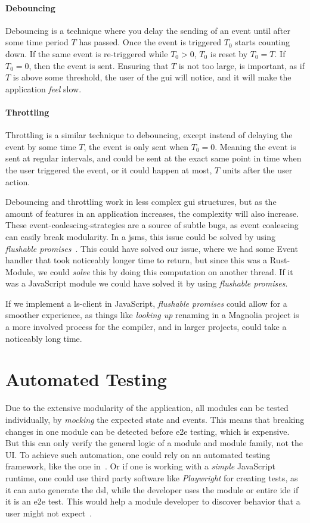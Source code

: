 \paragraph{Debouncing} Debouncing is a technique where you delay the sending of
an event until after some time period $T$ has passed. Once the event is triggered
$T_0$ starts counting down. If the same event is re-triggered while $T_0 > 0$,
$T_0$ is reset by $T_0 = T$. If $T_0 = 0$, then the event is sent. Ensuring that
$T$ is not too large, is important, as if $T$ is above some threshold, the user
of the \gls*{gui} will notice, and it will make the application \textit{feel}
slow.

\paragraph{Throttling} Throttling is a similar technique to debouncing, except
instead of delaying the event by some time $T$, the event is only sent when
$T_0 = 0$. Meaning the event is sent at regular intervals, and could be sent at
the exact same point in time when the user triggered the event, or it could
happen at most, $T$ units after the user action.

Debouncing and throttling work in less complex \gls*{gui} structures, but as the
amount of features in an application increases, the complexity will also
increase. These event-coalescing-strategies are a source of subtle bugs, as
event coalescing can easily break modularity. In a \gls*{jsms}, this issue could
be solved by using \textit{flushable promises}~\cite{flush}. This could have
solved our issue, where we had some Event handler that took noticeably longer
time to return, but since this was a Rust-Module, we could \textit{solve} this
by doing this computation on another thread. If it was a JavaScript module we
could have solved it by using \textit{flushable promises}.

If we implement a \gls*{ls}-client in JavaScript, \textit{flushable promises}
could allow for a smoother experience, as things like \textit{looking up}
renaming in a Magnolia project is a more involved process for the compiler,
and in larger projects, could take a noticeably long time.


\section{Automated Testing}

Due to the extensive modularity of the application, all modules can be tested
individually, by \textit{mocking} the expected state and events. This means that
breaking changes in one module can be detected before \gls*{e2e} testing, which
is expensive. But this can only verify the general logic of a module and module
family, not the UI. To achieve such automation, one could rely on an automated
testing framework, like the one in~\cite{autoUi}. Or if one is working with a
\textit{simple} JavaScript runtime, one could use third party software like
\textit{Playwright} for creating tests, as it can auto generate the \gls*{dsl},
while the developer uses the module or entire \gls*{ide} if it is an \gls*{e2e}
test. This would help a module developer to discover behavior that a user might
not expect~\cite{leastGui}.


